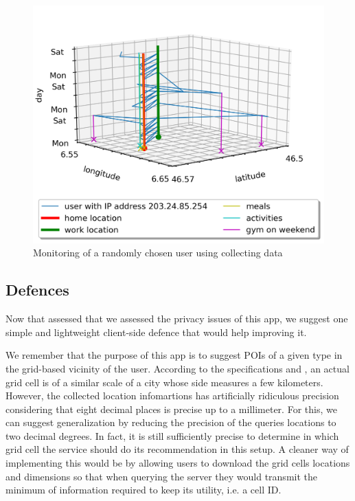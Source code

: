 \documentclass[10pt,conference,compsocconf]{IEEEtran}
\begin{document}
\begin{figure}
  \includegraphics[width=\columnwidth]{random.png}
  \caption{Monitoring of a randomly chosen user using collecting data}
  \label{random_fig}
\end{figure}

\subsection{Defences}
Now that assessed that we assessed the privacy issues of this app, we suggest one simple and lightweight client-side defence that would help improving it.

We remember that the purpose of this app is to suggest POIs of a given type in the grid-based vicinity of the user. According to the specifications and \cite{deg}, an actual grid cell is of a similar scale of a city whose side measures a few kilometers. However, the collected location infomartions has artificially ridiculous precision considering that eight decimal places is precise up to a millimeter\cite{relevant_xkcd}. For this, we can suggest generalization by reducing the precision of the queries locations to two decimal degrees. In fact, it is still sufficiently precise to determine in which grid cell the service should do its recommendation in this setup. A cleaner way of implementing this would be by allowing users to download the grid cells locations and dimensions so that when querying the server they would transmit the minimum of information required to keep its utility, i.e. a cell ID.
\end{document}
